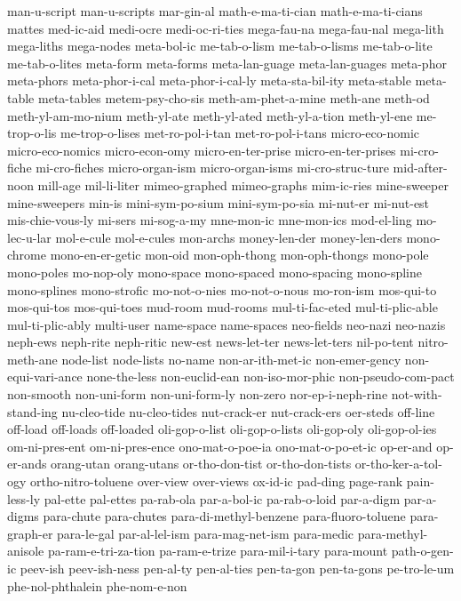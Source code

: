 {man-u-script
man-u-scripts
mar-gin-al
math-e-ma-ti-cian
math-e-ma-ti-cians
mattes
med-ic-aid
medi-ocre
medi-oc-ri-ties
mega-fau-na
mega-fau-nal
mega-lith
mega-liths
mega-nodes
meta-bol-ic
me-tab-o-lism
me-tab-o-lisms
me-tab-o-lite
me-tab-o-lites
meta-form
meta-forms
meta-lan-guage
meta-lan-guages
meta-phor
meta-phors
meta-phor-i-cal
meta-phor-i-cal-ly
meta-sta-bil-ity
meta-stable
meta-table
meta-tables
metem-psy-cho-sis
meth-am-phet-a-mine
meth-ane
meth-od
meth-yl-am-mo-nium
meth-yl-ate
meth-yl-ated
meth-yl-a-tion
meth-yl-ene
me-trop-o-lis
me-trop-o-lises
met-ro-pol-i-tan
met-ro-pol-i-tans
micro-eco-nomic
micro-eco-nomics
micro-econ-omy
micro-en-ter-prise
micro-en-ter-prises
mi-cro-fiche
mi-cro-fiches
micro-organ-ism
micro-organ-isms
mi-cro-struc-ture
mid-after-noon
mill-age
mil-li-liter
mimeo-graphed
mimeo-graphs
mim-ic-ries
mine-sweeper
mine-sweepers
min-is
mini-sym-po-sium
mini-sym-po-sia
mi-nut-er
mi-nut-est
mis-chie-vous-ly
mi-sers
mi-sog-a-my
mne-mon-ic
mne-mon-ics
mod-el-ling
mo-lec-u-lar
mol-e-cule
mol-e-cules
mon-archs
money-len-der
money-len-ders
mono-chrome
mono-en-er-getic
mon-oid
mon-oph-thong
mon-oph-thongs
mono-pole
mono-poles
mo-nop-oly
mono-space
mono-spaced
mono-spacing
mono-spline
mono-splines
mono-strofic
mo-not-o-nies
mo-not-o-nous
mo-ron-ism
mos-qui-to
mos-qui-tos
mos-qui-toes
mud-room
mud-rooms
mul-ti-fac-eted
mul-ti-plic-able
mul-ti-plic-ably
multi-user
name-space
name-spaces
neo-fields
neo-nazi
neo-nazis
neph-ews
neph-rite
neph-ritic
new-est
news-let-ter
news-let-ters
nil-po-tent
nitro-meth-ane
node-list
node-lists
no-name
non-ar-ith-met-ic
non-emer-gency
non-equi-vari-ance
none-the-less
non-euclid-ean
non-iso-mor-phic
non-pseudo-com-pact
non-smooth
non-uni-form
non-uni-form-ly
non-zero
nor-ep-i-neph-rine
not-with-stand-ing
nu-cleo-tide
nu-cleo-tides
nut-crack-er
nut-crack-ers
oer-steds
off-line
off-load
off-loads
off-loaded
oli-gop-o-list
oli-gop-o-lists
oli-gop-oly
oli-gop-ol-ies
om-ni-pres-ent
om-ni-pres-ence
ono-mat-o-poe-ia
ono-mat-o-po-et-ic
op-er-and
op-er-ands
orang-utan
orang-utans
or-tho-don-tist
or-tho-don-tists
or-tho-ker-a-tol-ogy
ortho-nitro-toluene
over-view
over-views
ox-id-ic
pad-ding
page-rank
pain-less-ly
pal-ette
pal-ettes
pa-rab-ola
par-a-bol-ic
pa-rab-o-loid
par-a-digm
par-a-digms
para-chute
para-chutes
para-di-methyl-benzene
para-fluoro-toluene
para-graph-er
para-le-gal
par-al-lel-ism
para-mag-net-ism
para-medic
para-methyl-anisole
pa-ram-e-tri-za-tion
pa-ram-e-trize
para-mil-i-tary
para-mount
path-o-gen-ic
peev-ish
peev-ish-ness
pen-al-ty
pen-al-ties
pen-ta-gon
pen-ta-gons
pe-tro-le-um
phe-nol-phthalein
phe-nom-e-non
}
